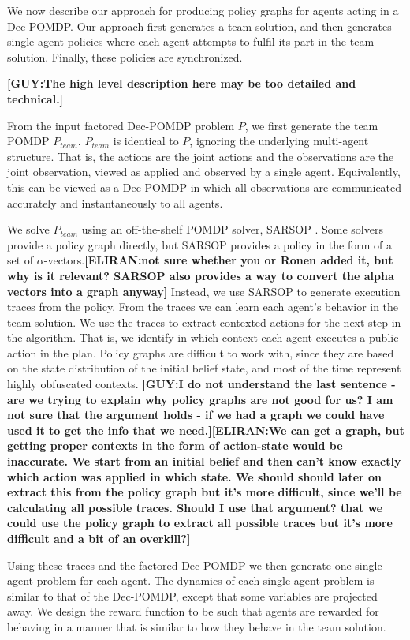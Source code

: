 \documentclass[letterpaper]{article} %
\newcommand{\eliran}[1]{\textbf{[\color{red}ELIRAN:#1]}}
\newcommand{\guy}[1]{\textbf{[\color{orange}GUY:#1]}}
\begin{document}
We now describe our approach for producing policy graphs for agents acting in a Dec-POMDP. Our approach first generates a team solution, and then generates single agent policies where each agent attempts to fulfil its part in the team solution. Finally, these policies are synchronized. 

\guy{The high level description here may be too detailed and technical.}

From the input factored Dec-POMDP problem $P$, we first generate the team POMDP $P_{team}$. $P_{team}$ is identical to $P$, ignoring the underlying multi-agent structure. That is, the actions are the joint actions and the observations are the joint observation, viewed as applied 
and observed by a single agent. Equivalently, this can be viewed as a Dec-POMDP in which all observations are communicated accurately and instantaneously 
to all agents.


We solve $P_{team}$ using an off-the-shelf POMDP solver, SARSOP \cite{}. Some solvers provide a policy graph directly, but SARSOP provides a policy in the form of a set of $\alpha$-vectors.\eliran{not sure whether you or Ronen added it, but why is it relevant? SARSOP also provides a way to convert the alpha vectors into a graph anyway} Instead, we use SARSOP to generate execution traces from the policy. From the traces we can learn each agent's behavior in the team solution.
We use the traces to extract contexted actions for the next step in the algorithm. That is, we identify in which context each agent executes a public action in the plan.
Policy graphs are difficult to work with, since they are based on the state distribution of the initial belief state, and most of the time represent highly obfuscated contexts. \guy{I do not understand the last sentence - are we trying to explain why policy graphs are not good for us? I am not sure that the argument holds - if we had a graph we could have used it to get the info that we need.}\eliran{We can get a graph, but getting proper contexts in the form of action-state would be inaccurate. We start from an initial belief and then can't know exactly which action was applied in which state. We should should later on extract this from the policy graph but it's more difficult, since we'll be calculating all possible traces. Should I use that argument? that we could use the policy graph to extract all possible traces but it's more difficult and a bit of an overkill?}

Using these traces and the factored Dec-POMDP we then generate
one single-agent problem for each agent. The dynamics of each single-agent problem is similar to that of the Dec-POMDP, except that some variables are projected away. We design the reward function to be such that agents are rewarded for behaving in a manner that is similar to how they behave in the team solution.
\end{document}
